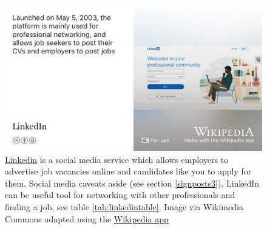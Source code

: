 \documentclass[
]{book}
\begin{document}
\begin{figure}

{\centering \includegraphics[width=0.9\linewidth]{images/linkedin} 

}

\caption{\href{https://en.wikipedia.org/wiki/LinkedIn}{Linkedin} is a social media service which allows employers to advertise job vacancies online and candidates like you to apply for them. Social media caveats aside (see section \ref{signposts3}), LinkedIn can be useful tool for networking with other professionals and finding a job, see table \ref{tab:linkedintable}. Image via Wikimedia Commons adapted using the \href{https://apps.apple.com/us/app/wikipedia/id324715238}{Wikipedia app}}\label{fig:linkedin-fig}
\end{figure}
\end{document}
